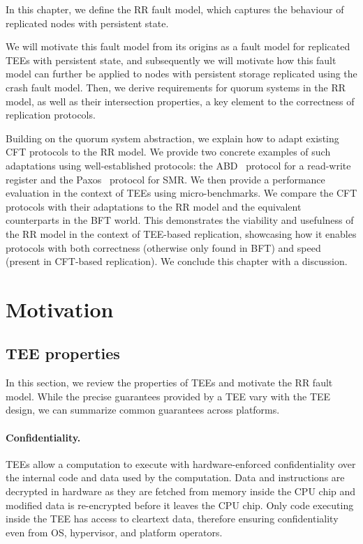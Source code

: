 \label{chap:model}
\cleardoublepage{}

In this chapter, we define the \ac{RR} fault model, which
captures the behaviour of replicated nodes with persistent state.

We will motivate this fault model from its origins as a fault model
for replicated \acp{TEE} with persistent state, and subsequently
we will motivate how this fault model can further be applied to
nodes with persistent storage replicated using the crash fault
model. Then, we derive requirements for quorum systems in the
\ac{RR} model, as well as their intersection properties, a key element to the
correctness of replication protocols.

Building on the quorum system abstraction, we explain how to
adapt existing \ac{CFT} protocols to the \ac{RR} model. We
provide two concrete examples of such adaptations using
well-established protocols: the \ac{ABD}~\cite{abd} protocol for
a read-write register and the Paxos~\cite{paxos} protocol for
\ac{SMR}.  We then provide a performance evaluation in the
context of \acp{TEE} using micro-benchmarks. We compare the
\ac{CFT} protocols with their adaptations to the \ac{RR} model
and the equivalent counterparts in the \ac{BFT} world. This
demonstrates the viability and usefulness of the \ac{RR} model in
the context of \ac{TEE}-based replication, showcasing how it
enables protocols with both correctness (otherwise only found in
\ac{BFT}) and speed (present in \ac{CFT}-based replication). We
conclude this chapter with a discussion.

\section{Motivation}\label{sec:motivation}

\subsection{\ac{TEE} properties}\label{ssec:tee_motivation}

In this section, we review the properties of \acp{TEE} and motivate the
\ac{RR} fault model. While the precise guarantees provided by a
\ac{TEE} vary with the \ac{TEE} design, we can summarize common guarantees across platforms.

\paragraph{Confidentiality.} \acp{TEE} allow a computation to execute with
hardware-enforced confidentiality over the internal code and data used
by the computation. Data and instructions are decrypted in hardware as
they are fetched from memory inside the CPU chip and modified data is
re-encrypted before it leaves the CPU chip. Only code executing inside
the \ac{TEE} has access to cleartext data, therefore ensuring
confidentiality even from \ac{OS}, hypervisor, and platform
operators.

